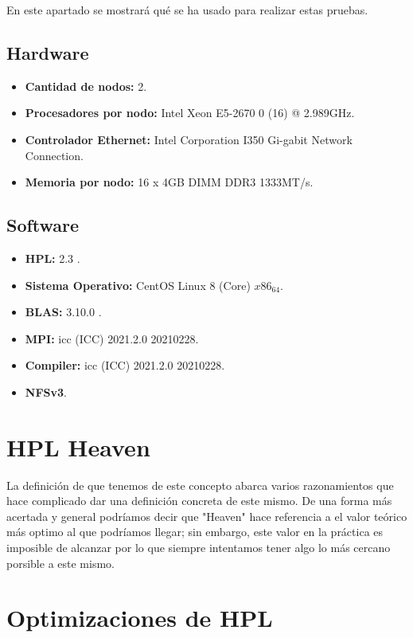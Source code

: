 \documentclass[conference]{IEEEtran}
\begin{document}
En este apartado se mostrará qué se ha usado para realizar estas pruebas.

\subsection{Hardware}

\begin{itemize}
    \item \textbf{Cantidad de nodos:} 2.
    \item \textbf{Procesadores por nodo:} Intel Xeon E5-2670 0 (16) @ 2.989GHz.
    \item \textbf{Controlador Ethernet:} Intel Corporation I350 Gi-gabit Network Connection.
    \item \textbf{Memoria por nodo:} 16 x 4GB DIMM DDR3 1333MT/s.
\end{itemize}

\subsection{Software}

\begin{itemize}
    \item \textbf{HPL:} 2.3 \cite{1}.
    \item \textbf{Sistema Operativo:} CentOS Linux 8 (Core) \(x86_64\).
    \item \textbf{BLAS:} 3.10.0 \cite{2}.
    \item \textbf{MPI:} icc (ICC) 2021.2.0 20210228.
    \item \textbf{Compiler:} icc (ICC) 2021.2.0 20210228.
    \item \textbf{NFSv3}.
\end{itemize}

\section{HPL Heaven}
La definición de que tenemos de este concepto abarca varios razonamientos
que hace complicado dar una definición concreta de este mismo. De una forma 
más acertada y general podríamos decir que "Heaven" hace referencia a el valor teórico 
más optimo al que podríamos llegar; sin embargo, este valor en la práctica es imposible 
de alcanzar por lo que siempre intentamos tener algo lo más cercano porsible a este mismo.

\section{Optimizaciones de HPL}
\end{document}
